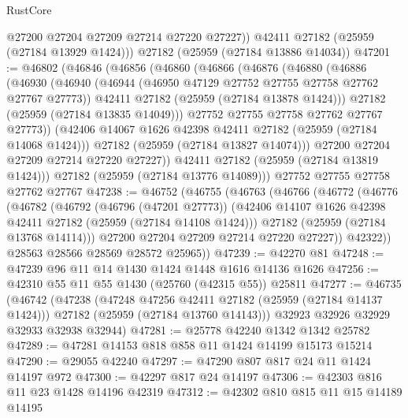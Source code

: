 \begin{lexlean}{RustCore}
\begin{coremodule}
          @27200
          @27204
          @27209
          @27214
          @27220
          @27227))
      @42411
      @27182
      (@25959 (@27184 @13929 @1424)))
    @27182
    (@25959 (@27184 @13886 @14034))
@47201 := @46802
    (@46846
      (@46856
        (@46860
          (@46866
            (@46876
              (@46880
                (@46886
                  (@46930
                    (@46940
                      (@46944 (@46950 @47129 @27752 @27755 @27758 @27762 @27767 @27773))
                      @42411
                      @27182
                      (@25959 (@27184 @13878 @1424)))
                    @27182
                    (@25959 (@27184 @13835 @14049)))
                  @27752
                  @27755
                  @27758
                  @27762
                  @27767
                  @27773))
              (@42406 @14067 @1626 @42398 @42411 @27182 (@25959 (@27184 @14068 @1424)))
              @27182
              (@25959 (@27184 @13827 @14074)))
            @27200
            @27204
            @27209
            @27214
            @27220
            @27227))
        @42411
        @27182
        (@25959 (@27184 @13819 @1424)))
      @27182
      (@25959 (@27184 @13776 @14089)))
    @27752
    @27755
    @27758
    @27762
    @27767
@47238 := @46752
    (@46755
      (@46763
        (@46766
          (@46772
            (@46776
              (@46782
                (@46792
                  (@46796 (@47201 @27773))
                  (@42406 @14107 @1626 @42398 @42411 @27182 (@25959 (@27184 @14108 @1424)))
                  @27182
                  (@25959 (@27184 @13768 @14114)))
                @27200
                @27204
                @27209
                @27214
                @27220
                @27227))
            @42322))
        @28563
        @28566
        @28569
        @28572
        @25965))
@47239 := @42270 @81
@47248 := @47239 @96 @11 @14 @1430 @1424 @1448 @1616 @14136 @1626
@47256 := @42310 @55 @11 @55 @1430 (@25760 (@42315 @55)) @25811
@47277 := @46735
    (@46742
      (@47238
        (@47248 @47256 @42411 @27182 (@25959 (@27184 @14137 @1424)))
        @27182
        (@25959 (@27184 @13760 @14143)))
      @32923
      @32926
      @32929
      @32933
      @32938
      @32944)
@47281 := @25778 @42240 @1342 @1342 @25782
@47289 := @47281 @14153 @818 @858 @11 @1424 @14199 @15173 @15214
@47290 := @29055 @42240
@47297 := @47290 @807 @817 @24 @11 @1424 @14197 @972
@47300 := @42297 @817 @24 @14197
@47306 := @42303 @816 @11 @23 @1428 @14196 @42319
@47312 := @42302 @810 @815 @11 @15 @14189 @14195

\end{coremodule}
\end{lexlean}
